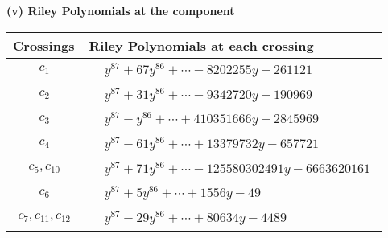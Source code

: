 \documentclass[1p]{elsarticle_modified}
\theoremstyle{definition}
\begin{document}
\newpage\renewcommand{\arraystretch}{1}
\flushleft \textbf{(v) Riley Polynomials at the component}\newline \\
\begin{tabular}{m{50pt}|m{274pt}}
Crossings & \hspace{64pt}Riley Polynomials at each crossing \\
\hline $$\begin{aligned}c_{1}\end{aligned}$$&$\begin{aligned}
&y^{87}+67 y^{86}+\cdots-8202255 y-261121
\end{aligned}$\\
\hline $$\begin{aligned}c_{2}\end{aligned}$$&$\begin{aligned}
&y^{87}+31 y^{86}+\cdots-9342720 y-190969
\end{aligned}$\\
\hline $$\begin{aligned}c_{3}\end{aligned}$$&$\begin{aligned}
&y^{87}- y^{86}+\cdots+410351666 y-2845969
\end{aligned}$\\
\hline $$\begin{aligned}c_{4}\end{aligned}$$&$\begin{aligned}
&y^{87}-61 y^{86}+\cdots+13379732 y-657721
\end{aligned}$\\
\hline $$\begin{aligned}c_{5},c_{10}\end{aligned}$$&$\begin{aligned}
&y^{87}+71 y^{86}+\cdots-125580302491 y-6663620161
\end{aligned}$\\
\hline $$\begin{aligned}c_{6}\end{aligned}$$&$\begin{aligned}
&y^{87}+5 y^{86}+\cdots+1556 y-49
\end{aligned}$\\
\hline $$\begin{aligned}c_{7},c_{11},c_{12}\end{aligned}$$&$\begin{aligned}
&y^{87}-29 y^{86}+\cdots+80634 y-4489
\end{aligned}$\\

\end{tabular}
\end{document}
